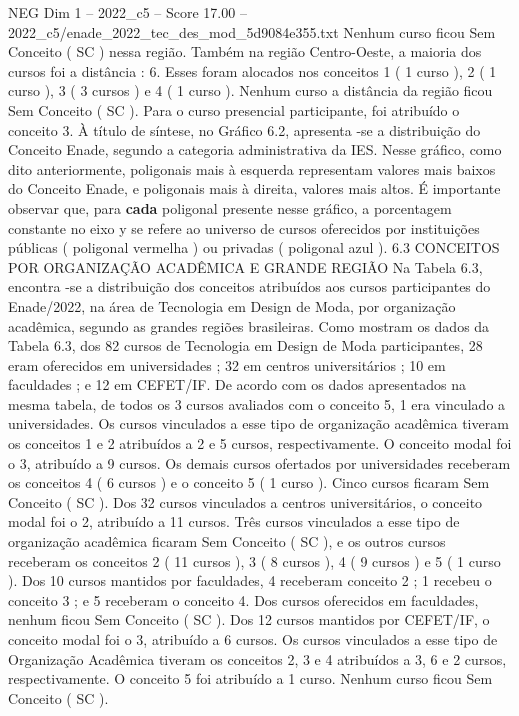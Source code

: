 \begin{textsample}{NEG Dim 1 – 2022\_c5 – Score 17.00 – 2022\_c5/enade\_2022\_tec\_des\_mod\_5d9084e355.txt}
Nenhum curso ficou Sem Conceito ( SC ) nessa região.
Também na região Centro-Oeste, a maioria dos cursos foi a distância : 6.
Esses foram alocados nos conceitos 1 ( 1 curso ), 2 ( 1 curso ), 3 ( 3 cursos ) e 4 ( 1 curso ).
Nenhum curso a distância da região ficou Sem Conceito ( SC ).
Para o curso presencial participante, foi atribuído o conceito 3.
À título de síntese, no Gráfico 6.2, apresenta -se a distribuição do Conceito Enade, segundo a categoria administrativa da IES.
Nesse gráfico, como dito anteriormente, poligonais mais à esquerda representam valores mais baixos do Conceito Enade, e poligonais mais à direita, valores mais altos.
É importante observar que, para \textbf{cada} poligonal presente nesse gráfico, a porcentagem constante no eixo y se refere ao universo de cursos oferecidos por instituições públicas ( poligonal vermelha ) ou privadas ( poligonal azul ). 6.3 CONCEITOS POR ORGANIZAÇÃO ACADÊMICA E GRANDE REGIÃO Na Tabela 6.3, encontra -se a distribuição dos conceitos atribuídos aos cursos participantes do Enade/2022, na área de Tecnologia em Design de Moda, por organização acadêmica, segundo as grandes regiões brasileiras.
Como mostram os dados da Tabela 6.3, dos 82 cursos de Tecnologia em Design de Moda participantes, 28 eram oferecidos em universidades ; 32 em centros universitários ; 10 em faculdades ; e 12 em CEFET/IF.
De acordo com os dados apresentados na mesma tabela, de todos os 3 cursos avaliados com o conceito 5, 1 era vinculado a universidades.
Os cursos vinculados a esse tipo de organização acadêmica tiveram os conceitos 1 e 2 atribuídos a 2 e 5 cursos, respectivamente.
O conceito modal foi o 3, atribuído a 9 cursos.
Os demais cursos ofertados por universidades receberam os conceitos 4 ( 6 cursos ) e o conceito 5 ( 1 curso ).
Cinco cursos ficaram Sem Conceito ( SC ).
Dos 32 cursos vinculados a centros universitários, o conceito modal foi o 2, atribuído a 11 cursos.
Três cursos vinculados a esse tipo de organização acadêmica ficaram Sem Conceito ( SC ), e os outros cursos receberam os conceitos 2 ( 11 cursos ), 3 ( 8 cursos ), 4 ( 9 cursos ) e 5 ( 1 curso ).
Dos 10 cursos mantidos por faculdades, 4 receberam conceito 2 ; 1 recebeu o conceito 3 ; e 5 receberam o conceito 4.
Dos cursos oferecidos em faculdades, nenhum ficou Sem Conceito ( SC ).
Dos 12 cursos mantidos por CEFET/IF, o conceito modal foi o 3, atribuído a 6 cursos.
Os cursos vinculados a esse tipo de Organização Acadêmica tiveram os conceitos 2, 3 e 4 atribuídos a 3, 6 e 2 cursos, respectivamente.
O conceito 5 foi atribuído a 1 curso.
Nenhum curso ficou Sem Conceito ( SC ).

\end{textsample}
